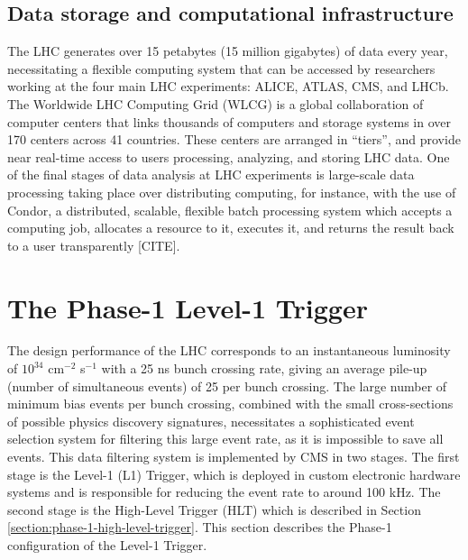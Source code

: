 \documentclass{article}
\begin{document}
\subsection{Data storage and computational infrastructure}

The LHC generates over 15 petabytes (15 million gigabytes) of data every year, necessitating a flexible computing system that can be accessed by researchers working at the four main LHC experiments: ALICE, ATLAS, CMS, and LHCb. The Worldwide LHC Computing Grid (WLCG) is a global collaboration of computer centers that links thousands of computers and storage systems in over 170 centers across 41 countries. These centers are arranged in ``tiers'', and provide near real-time access to users processing, analyzing, and storing LHC data. One of the final stages of data analysis at LHC experiments is large-scale data processing taking place over distributing computing, for instance, with the use of Condor, a distributed, scalable, flexible batch processing system which accepts a computing job, allocates a resource to it, executes it, and returns the result back to a user transparently [CITE]. 
 


\section{The Phase-1 Level-1 Trigger}
\label{section:phase-1-l1-trigger}
The design performance of the LHC corresponds to an instantaneous luminosity of $10^{34}$ cm$^{-2}$ s$^{-1}$ with a 25 ns bunch crossing rate, giving an average pile-up (number of simultaneous events) of 25 per bunch crossing. The large number of minimum bias events per bunch crossing, combined with the small cross-sections of possible physics discovery signatures, necessitates a sophisticated event selection system for filtering this large event rate, as it is impossible to save all events. This data filtering system is implemented by CMS in two stages. The first stage is the Level-1 (L1) Trigger, which is deployed in custom electronic hardware systems and is responsible for reducing the event rate to around 100 kHz. The second stage is the High-Level Trigger (HLT) which is described in Section \ref{section:phase-1-high-level-trigger}. This section describes the Phase-1 configuration of the Level-1 Trigger.
\end{document}
